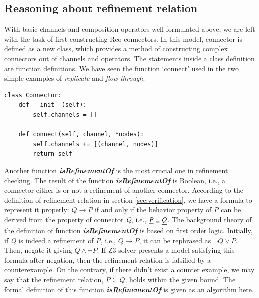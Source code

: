 \documentclass[3p,times]{elsarticle}
\begin{document}
\subsection{Reasoning about refinement relation}
With basic channels and composition operators well formulated above, we are left with the task of first constructing Reo connectors. In this model, connector is defined as a new class, which provides a method of constructing complex connectors out of channels and operators.
The statements inside a class definition are function definitions. We have seen the function `connect' used in the two simple examples of \emph{replicate} and \emph{flow-through}.
\begin{lstlisting}[frame=single]
class Connector:
    def __init__(self):
        self.channels = []

    def connect(self, channel, *nodes):
        self.channels += [(channel, nodes)]
        return self
\end{lstlisting}
Another function \textbf{\emph{isRefinementOf}} is the most crucial one in refinement checking. The result of the function \textbf{\emph{isRefinementOf}} is Boolean, i.e., a connector either is or not a refinement of another connector. According to the definition of refinement relation in section \ref{sec:verification}, we have a formula to represent it properly: $Q \rightarrow P$ if and only if the behavior property of \emph{P} can be derived from the property of connector \emph{Q}, i.e., $\emph{P} \sqsubseteq \emph{Q}$. The background theory of the definition of function  \textbf{\emph{isRefinementOf}} is based on first order logic. Initially, if \emph{Q} is indeed a refinement of \emph{P}, i.e., $Q \rightarrow P$, it can be rephrased as $\neg Q \vee P$. Then, negate it giving $Q \wedge \neg P$. If Z3 solver presents a model satisfying this formula after negation, then the refinement relation is falsified by a counterexample. On the contrary, if there didn't exist a counter example, we may say that the refinement relation, $P\subseteq Q$, holds within the given bound. The formal definition of this function \textbf{\emph{isRefinementOf}} is given as an algorithm here.
\end{document}
